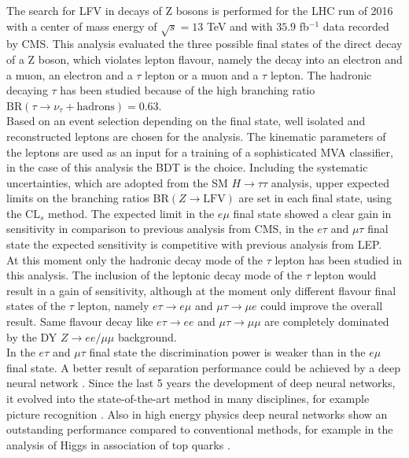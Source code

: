 The search for \gls{LFV} in decays of Z bosons is performed for the \gls{LHC} run of 2016 with a center of mass energy of $\sqrt{s} = 13$ TeV and with $35.9$ fb$^{-1}$ data recorded by \gls{CMS}. This analysis evaluated the three possible final states of the direct decay of a Z boson, which violates lepton flavour, namely the decay into an electron and a muon, an electron and a $\tau$ lepton or a muon and a $\tau$ lepton. The hadronic decaying $\tau$ has been studied because of the high branching ratio $\text{BR}(\tau \to \nu_{\tau} + \text{hadrons}) = 0.63$. \\

Based on an event selection depending on the final state, well isolated and reconstructed leptons are chosen for the analysis. The kinematic parameters of the leptons are used as an input for a training of a sophisticated \gls{MVA} classifier, in the case of this analysis the \gls{BDT} is the choice. Including the systematic uncertainties, which are adopted from the \gls{SM} $H \to \tau\tau$ analysis, upper expected limits on the branching ratios $\text{BR}(Z \to \text{LFV})$ are set in each final state, using the $\text{CL}_{s}$ method. The expected limit in the $e\mu$ final state showed a clear gain in sensitivity in comparison to previous analysis from \gls{CMS}, in the $e\tau$ and $\mu\tau$ final state the expected sensitivity is competitive with previous analysis from \gls{LEP}. \\

At this moment only the hadronic decay mode of the $\tau$ lepton has been studied in this analysis. The inclusion of the leptonic decay mode of the $\tau$ lepton would result in a gain of sensitivity, although at the moment only different flavour final states of the $\tau$ lepton, namely $e\tau \to e\mu$ and $\mu\tau \to \mu e$ could improve the overall result. Same flavour decay like $e\tau \to ee$ and $\mu\tau \to \mu\mu$ are completely dominated by the \gls{DY} $Z\to ee/\mu\mu$ background. \\

In the $e\tau$ and $\mu\tau$ final state the discrimination power is weaker than in the $e\mu$ final state. A better result of separation performance could be achieved by a deep neural network \cite{DNN}. Since the last 5 years the development of deep neural networks, it evolved into the state-of-the-art method in many disciplines, for example picture recognition \cite{DNN2}. Also in high energy physics deep neural networks show an outstanding performance compared to conventional methods, for example in the analysis of Higgs in association of top quarks \cite{DNN3}. \\

